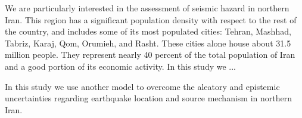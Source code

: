 We are particularly interested in the assessment of seismic hazard in northern Iran. This region has a significant population density with respect to the rest of the country, and includes some of its most populated cities: Tehran, Mashhad, Tabriz, Karaj, Qom, Orumieh, and Rasht. These cities alone house about 31.5 million people. They represent nearly 40 percent of the total population of Iran and a good portion of its economic activity. In this study we ...


In this study we use another model to overcome the aleatory and epistemic uncertainties regarding earthquake location and source mechanism in northern Iran.\\











